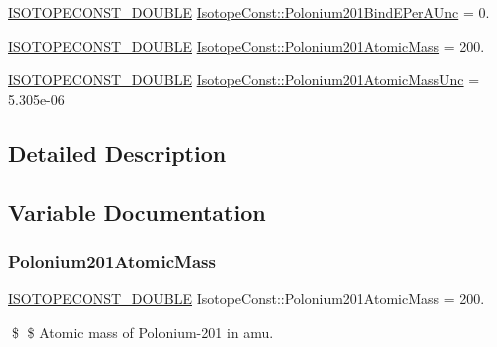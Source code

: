 \begin{DoxyCompactItemize}
\mbox{\hyperlink{group___isotope_const-_macros_ga8f45a7272ce02c0b4c65c44636ed719a}{I\+S\+O\+T\+O\+P\+E\+C\+O\+N\+S\+T\+\_\+\+D\+O\+U\+B\+LE}} \mbox{\hyperlink{group___isotope_const-_polonium-_po201_ga253d9caa82e1a21877cbffc49a73c7f9}{Isotope\+Const\+::\+Polonium201\+Bind\+E\+Per\+A\+Unc}} = 0.
\item 
\mbox{\hyperlink{group___isotope_const-_macros_ga8f45a7272ce02c0b4c65c44636ed719a}{I\+S\+O\+T\+O\+P\+E\+C\+O\+N\+S\+T\+\_\+\+D\+O\+U\+B\+LE}} \mbox{\hyperlink{group___isotope_const-_polonium-_po201_ga29dfc638428353489b7afdab818d6784}{Isotope\+Const\+::\+Polonium201\+Atomic\+Mass}} = 200.
\item 
\mbox{\hyperlink{group___isotope_const-_macros_ga8f45a7272ce02c0b4c65c44636ed719a}{I\+S\+O\+T\+O\+P\+E\+C\+O\+N\+S\+T\+\_\+\+D\+O\+U\+B\+LE}} \mbox{\hyperlink{group___isotope_const-_polonium-_po201_ga413714f1792d4b451d3c41b868afac3f}{Isotope\+Const\+::\+Polonium201\+Atomic\+Mass\+Unc}} = 5.\+305e-\/06
\end{DoxyCompactItemize}


\subsection{Detailed Description}


\subsection{Variable Documentation}
\mbox{\label{group___isotope_const-_polonium-_po201_ga29dfc638428353489b7afdab818d6784}} 
\subsubsection{\texorpdfstring{Polonium201\+Atomic\+Mass}{Polonium201AtomicMass}}
{\footnotesize\ttfamily \mbox{\hyperlink{group___isotope_const-_macros_ga8f45a7272ce02c0b4c65c44636ed719a}{I\+S\+O\+T\+O\+P\+E\+C\+O\+N\+S\+T\+\_\+\+D\+O\+U\+B\+LE}} Isotope\+Const\+::\+Polonium201\+Atomic\+Mass = 200.}

\$ \$ Atomic mass of Polonium-\/201 in amu. \mbox{\label{group___isotope_const-_polonium-_po201_ga413714f1792d4b451d3c41b868afac3f}} 

